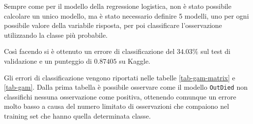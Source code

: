 Sempre come per il modello della regressione logistica, non è stato possibile calcolare un unico modello, ma è stato necessario definire 5 modelli, uno per ogni possibile valore della variabile risposta, per poi classificare l'osservazione utilizzando la classe più probabile.

Così facendo si è ottenuto un errore di classificazione del $34.03\%$ sul test di validazione e un punteggio di $0.87405$ su Kaggle.

Gli errori di classificazione vengono riportati nelle tabelle \ref{tab-gam-matrix} e \ref{tab-gam}. 
Dalla prima tabella è possibile osservare come il modello \texttt{OutDied} non classifichi nessuna osservazione come positiva, ottenendo comunque un errore molto basso a causa del numero limitato di osservazioni che compaiono nel training set che hanno quella determinata classe. 

